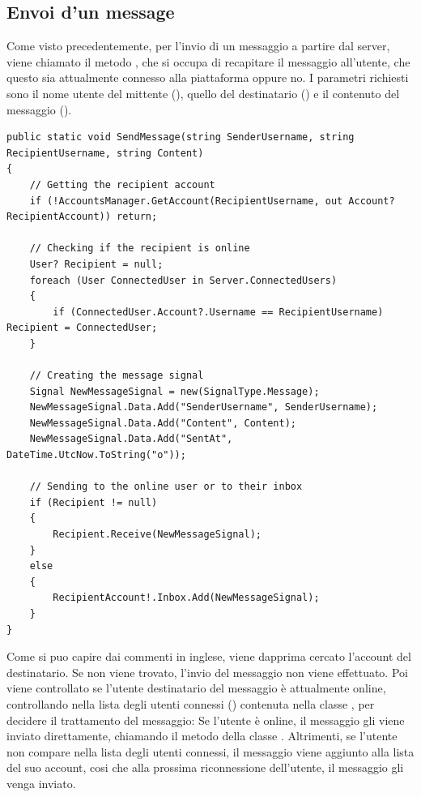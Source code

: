 \documentclass[12pt]{report}
\begin{document}
\subsection{Envoi d'un message}

Come visto precedentemente, per l'invio di un messaggio a partire dal server, viene chiamato il metodo , che si occupa di recapitare il messaggio all'utente, che questo sia attualmente connesso alla piattaforma oppure no. I parametri richiesti sono il nome utente del mittente (), quello del destinatario () e il contenuto del messaggio ().

\begin{verbatim}
public static void SendMessage(string SenderUsername, string RecipientUsername, string Content)
{
	// Getting the recipient account
	if (!AccountsManager.GetAccount(RecipientUsername, out Account? RecipientAccount)) return;
	
	// Checking if the recipient is online
	User? Recipient = null;
	foreach (User ConnectedUser in Server.ConnectedUsers)
	{
		if (ConnectedUser.Account?.Username == RecipientUsername) Recipient = ConnectedUser;
	}
	
	// Creating the message signal
	Signal NewMessageSignal = new(SignalType.Message);
	NewMessageSignal.Data.Add("SenderUsername", SenderUsername);
	NewMessageSignal.Data.Add("Content", Content);
	NewMessageSignal.Data.Add("SentAt", DateTime.UtcNow.ToString("o"));
	
	// Sending to the online user or to their inbox
	if (Recipient != null)
	{
		Recipient.Receive(NewMessageSignal);
	}
	else
	{
		RecipientAccount!.Inbox.Add(NewMessageSignal);
	}
}
\end{verbatim}

Come si puo capire dai commenti in inglese, viene dapprima cercato l'account  del destinatario. Se non viene trovato, l'invio del messaggio non viene effettuato.
Poi viene controllato se l'utente destinatario del messaggio è attualmente online, controllando nella lista degli utenti connessi () contenuta nella classe , per decidere il trattamento del messaggio:
Se l'utente è online, il messaggio gli viene inviato direttamente, chiamando il metodo  della classe .
Altrimenti, se l'utente non compare nella lista degli utenti connessi, il messaggio viene aggiunto alla lista  del suo account, cosi che alla prossima riconnessione dell'utente, il messaggio gli venga inviato.
\end{document}
